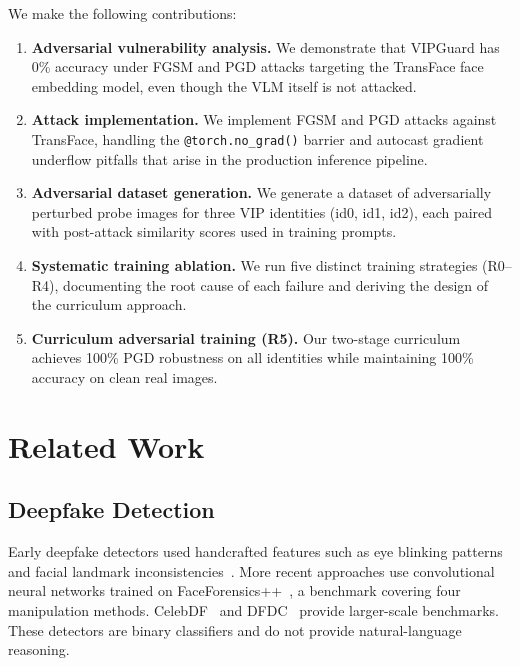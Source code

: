 \documentclass[12pt,a4paper]{article}
\begin{document}
We make the following contributions:

\begin{enumerate}[leftmargin=*]
  \item \textbf{Adversarial vulnerability analysis.}  We demonstrate that VIPGuard
  has 0\% accuracy under FGSM and PGD attacks targeting the TransFace face embedding
  model, even though the VLM itself is not attacked.

  \item \textbf{Attack implementation.}  We implement FGSM and PGD attacks against
  TransFace, handling the \texttt{@torch.no\_grad()} barrier and autocast gradient
  underflow pitfalls that arise in the production inference pipeline.

  \item \textbf{Adversarial dataset generation.}  We generate a dataset of
  adversarially perturbed probe images for three VIP identities (id0, id1, id2),
  each paired with post-attack similarity scores used in training prompts.

  \item \textbf{Systematic training ablation.}  We run five distinct training
  strategies (R0--R4), documenting the root cause of each failure and deriving
  the design of the curriculum approach.

  \item \textbf{Curriculum adversarial training (R5).}  Our two-stage curriculum
  achieves 100\% PGD robustness on all identities while maintaining 100\% accuracy
  on clean real images.
\end{enumerate}

\section{Related Work}

\subsection{Deepfake Detection}

Early deepfake detectors used handcrafted features such as eye blinking patterns
and facial landmark inconsistencies~\cite{li2018ictu}.  More recent approaches
use convolutional neural networks trained on FaceForensics++~\cite{rossler2019faceforensics},
a benchmark covering four manipulation methods.  CelebDF~\cite{li2020celeb} and
DFDC~\cite{dolhansky2020deepfake} provide larger-scale benchmarks.  These
detectors are binary classifiers and do not provide natural-language reasoning.
\end{document}
